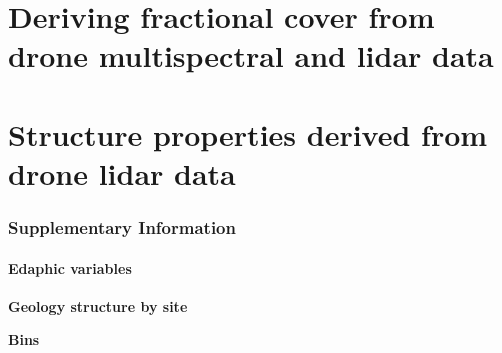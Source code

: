 \documentclass{thesis}
\begin{document}
\pagestyle{header-footer}
\part{Deriving fractional cover from drone multispectral and lidar data}






\setcounter{chapter}{0}

\part{Structure properties derived from drone lidar data}






\clearpage


\label{app:bibTex}

\appendix

\vspace{-1em}

\section{Supplementary Information}\label{app:dataset}

\subsection{Edaphic variables}
\textbf{Geology structure by site}

\begin{figure}[h!]
	\centering
\end{figure}

\textbf{Bins}

\begin{figure}[h!]
	\centering
\end{figure}
\end{document}
